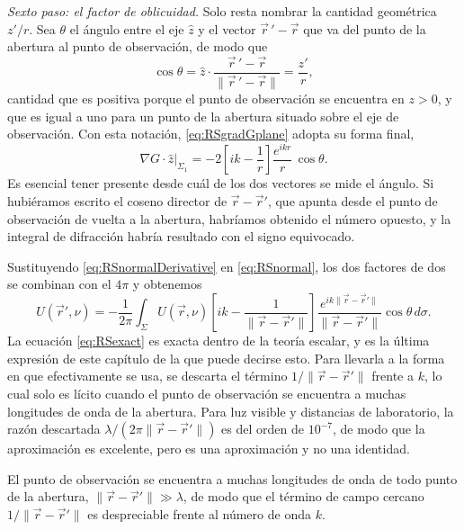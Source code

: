 		\textit{Sexto paso: el factor de oblicuidad.} Solo resta nombrar la cantidad geométrica $z'/r$. Sea $\theta$ el ángulo entre el eje $\hat{z}$ y el vector $\vec{r}\,'-\vec{r}$ que va del punto de la abertura al punto de observación, de modo que
		\begin{equation}\label{eq:RSobliquity}
			\cos\theta = \hat{z}\cdot\dfrac{\vec{r}\,'-\vec{r}}{\|\vec{r}\,'-\vec{r}\|} = \dfrac{z'}{r} ,
		\end{equation}
		cantidad que es positiva porque el punto de observación se encuentra en $z>0$, y que es igual a uno para un punto de la abertura situado sobre el eje de observación. Con esta notación, \eqref{eq:RSgradGplane} adopta su forma final,
		\begin{equation}\label{eq:RSnormalDerivative}
			\left.\nabla G\cdot\hat{z}\right|_{\Sigma_{1}} = -2\left[ik-\dfrac{1}{r}\right]\dfrac{e^{ikr}}{r}\,\cos\theta .
		\end{equation}
		Es esencial tener presente desde cuál de los dos vectores se mide el ángulo. Si hubiéramos escrito el coseno director de $\vec{r}-\vec{r}'$, que apunta desde el punto de observación de vuelta a la abertura, habríamos obtenido el número opuesto, y la integral de difracción habría resultado con el signo equivocado.

		Sustituyendo \eqref{eq:RSnormalDerivative} en \eqref{eq:RSnormal}, los dos factores de dos se combinan con el $4\pi$ y obtenemos
		\begin{equation}\label{eq:RSexact}
			U(\vec{r}',\nu) = -\dfrac{1}{2\pi} \int_{\Sigma} U(\vec{r},\nu) \left[ik - \dfrac{1}{\|\vec{r} - \vec{r}'\|} \right] \dfrac{e^{ik\|\vec{r}-\vec{r}'\|}}{\|\vec{r}-\vec{r}'\|} \cos\theta\,d\sigma .
		\end{equation}
		La ecuación \eqref{eq:RSexact} es exacta dentro de la teoría escalar, y es la última expresión de este capítulo de la que puede decirse esto. Para llevarla a la forma en que efectivamente se usa, se descarta el término $1/\|\vec{r}-\vec{r}'\|$ frente a $k$, lo cual solo es lícito cuando el punto de observación se encuentra a muchas longitudes de onda de la abertura. Para luz visible y distancias de laboratorio, la razón descartada $\lambda/(2\pi\|\vec{r}-\vec{r}'\|)$ es del orden de $10^{-7}$, de modo que la aproximación es excelente, pero es una aproximación y no una identidad.

		\begin{Assumption}
			El punto de observación se encuentra a muchas longitudes de onda de todo punto de la abertura, $\|\vec{r}-\vec{r}'\| \gg \lambda$, de modo que el término de campo cercano $1/\|\vec{r}-\vec{r}'\|$ es despreciable frente al número de onda $k$.
		\end{Assumption}


